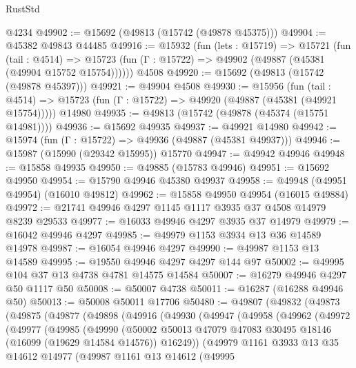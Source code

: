 \begin{lexlean}{RustStd}
\begin{coremodule}
    @4234
@49902 := @15692 (@49813 (@15742 (@49878 @45375)))
@49904 := @45382 @49843 @44485
@49916 := @15932
    (fun (lets : @15719) =>
    @15721
      (fun (tail : @4514) =>
      @15723 (fun (Γ : @15722) => @49902 (@49887 (@45381 (@49904 @15752 @15754))))))
    @4508
@49920 := @15692 (@49813 (@15742 (@49878 @45397)))
@49921 := @49904 @4508
@49930 := @15956
    (fun (tail : @4514) => @15723 (fun (Γ : @15722) => @49920 (@49887 (@45381 (@49921 @15754)))))
    @14980
@49935 := @49813 (@15742 (@49878 (@45374 (@15751 @14981))))
@49936 := @15692 @49935
@49937 := @49921 @14980
@49942 := @15974 (fun (Γ : @15722) => @49936 (@49887 (@45381 @49937)))
@49946 := @15987 (@15990 (@29342 @15995)) @15770
@49947 := @49942 @49946
@49948 := @15858 @49935
@49950 := @49885 (@15783 @49946)
@49951 := @15692 @49950
@49954 := @15790 @49946 @45380 @49937
@49958 := @49948 (@49951 @49954) (@16010 @49812)
@49962 := @15858 @49950 @49954 (@16015 @49884)
@49972 := @21741 @49946 @4297 @1145 @1117 @3935 @37 @4508 @14979 @8239 @29533
@49977 := @16033 @49946 @4297 @3935 @37 @14979
@49979 := @16042 @49946 @4297
@49985 := @49979 @1153 @3934 @13 @36 @14589 @14978
@49987 := @16054 @49946 @4297
@49990 := @49987 @1153 @13 @14589
@49995 := @19550 @49946 @4297 @4297 @144 @97
@50002 := @49995 @104 @37 @13 @4738 @4781 @14575 @14584
@50007 := @16279 @49946 @4297 @50 @1117 @50
@50008 := @50007 @4738
@50011 := @16287 (@16288 @49946 @50)
@50013 := @50008 @50011 @17706
@50480 := @49807
    (@49832
      (@49873
        (@49875
          (@49877
            (@49898
              (@49916
                (@49930
                  (@49947
                    (@49958
                      (@49962
                        (@49972
                          (@49977
                            (@49985
                              (@49990
                                (@50002
                                  @50013
                                  @47079
                                  @47083
                                  @30495
                                  @18146
                                  (@16099 (@19629 @14584 @14576))
                                  @16249))
                              (@49979
                                @1161
                                @3933
                                @13
                                @35
                                @14612
                                @14977
                                (@49987
                                  @1161
                                  @13
                                  @14612
                                  (@49995

\end{coremodule}
\end{lexlean}
